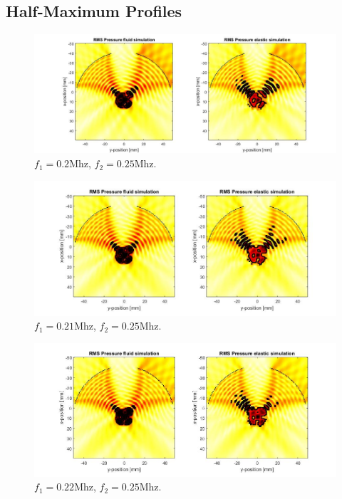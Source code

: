 \documentclass[10pt,a4paper]{article}
\begin{document}
\subsection*{Half-Maximum Profiles}

\begin{figure}[H]
\hspace*{-4cm}                                                    
\includegraphics[scale=0.55]{comp_200kHz}
\caption{$f_1  = 0.2$Mhz, $f_2 = 0.25$Mhz.}
\label{comp_200kHz}
\end{figure}
\begin{figure}[H]
\hspace*{-4cm}                                                    
\includegraphics[scale=0.6]{comp_210kHz}
\caption{$f_1  = 0.21$Mhz, $f_2 = 0.25$Mhz.}
\label{comp_210kHz}
\end{figure}
\begin{figure}[H]
\hspace*{-4cm}                                                    
\includegraphics[scale=0.6]{comp_220kHz}
\caption{$f_1  = 0.22$Mhz, $f_2 = 0.25$Mhz.}
\label{comp_220kHz}
\end{figure}
\end{document}
